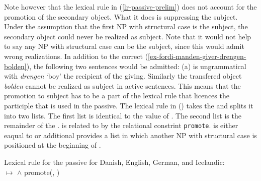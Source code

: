 Note however that the lexical rule in (\ref{lr-passive-prelim}) does not account for the promotion
of the secondary object. What it does is suppressing the subject. Under the assumption that the
first NP with structural case is the subject, the secondary object could never be realized as
subject. Note that it would not help to say any NP with structural case can be the subject, since
this would admit wrong realizations. In addition to the correct
(\ref{ex-fordi-manden-giver-drengen-bolden}), the following two sentences would be admitted: 
\eal
{}
\zl
(a) is ungrammatical with \emph{drengen} `boy' the recipient of the giving. Similarly the
transfered object \emph{bolden} cannot be realized as subject in active sentences. This means that
the promotion to subject has to be a part of the lexical  rule that licences the participle that is
used in the passive. The lexical rule in () takes the \argstl and splits it into two
lists. The first list  is identical to the value of \da. The second list  is the
remainder of the \argstl.  is related to  by the relational constrint
\texttt{promote}.  is either eaqual to  or additional provides a list in which
another NP with structural case is positioned at the beginning of .

\eas
\label{lr-passive-double-object}
Lexical rule for the passive for Danish, English, German, and Icelandic:\\
 $\mapsto$
 $\wedge$ promote(, )
\zs


